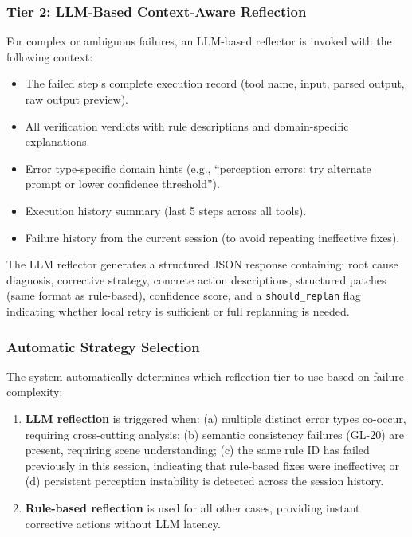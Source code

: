 \documentclass[journal]{IEEEtran}
\begin{document}
\subsubsection{Tier 2: LLM-Based Context-Aware Reflection}
For complex or ambiguous failures, an LLM-based reflector is invoked with the following context:

\begin{itemize}[leftmargin=*]
    \item The failed step's complete execution record (tool name, input, parsed output, raw output preview).
    \item All verification verdicts with rule descriptions and domain-specific explanations.
    \item Error type-specific domain hints (e.g., ``perception errors: try alternate prompt or lower confidence threshold'').
    \item Execution history summary (last 5 steps across all tools).
    \item Failure history from the current session (to avoid repeating ineffective fixes).
\end{itemize}

The LLM reflector generates a structured JSON response containing: root cause diagnosis, corrective strategy, concrete action descriptions, structured patches (same format as rule-based), confidence score, and a \texttt{should\_replan} flag indicating whether local retry is sufficient or full replanning is needed.

\subsubsection{Automatic Strategy Selection}
The system automatically determines which reflection tier to use based on failure complexity:

\begin{enumerate}[leftmargin=*]
    \item \textbf{LLM reflection} is triggered when: (a) multiple distinct error types co-occur, requiring cross-cutting analysis; (b) semantic consistency failures (GL-20) are present, requiring scene understanding; (c) the same rule ID has failed previously in this session, indicating that rule-based fixes were ineffective; or (d) persistent perception instability is detected across the session history.
    \item \textbf{Rule-based reflection} is used for all other cases, providing instant corrective actions without LLM latency.
\end{enumerate}
\end{document}

